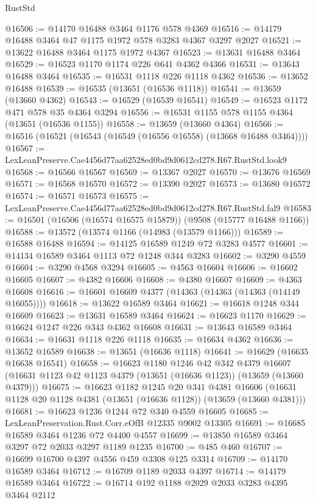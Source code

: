 \begin{lexlean}{RustStd}
\begin{coremodule}
@16506 := @14170 @16488 @3464 @1176 @578 @4369
@16516 := @14179 @16488 @3464 @47 @1175 @1972 @578 @3283 @4367 @3297 @2027
@16521 := @13622 @16488 @3464 @1175 @1972 @4367
@16523 := @13631 @16488 @3464
@16529 := @16523 @1170 @1174 @226 @641 @4362 @4366
@16531 := @13643 @16488 @3464
@16535 := @16531 @1118 @226 @1118 @4362
@16536 := @13652 @16488
@16539 := @16535 (@13651 (@16536 @1118))
@16541 := @13659 (@13660 @4362)
@16543 := @16529 (@16539 @16541)
@16549 := @16523 @1172 @471 @578 @35 @4364 @3294
@16556 := @16531 @1155 @578 @1155 @4364 (@13651 (@16536 @1155))
@16558 := @13659 (@13660 @4364)
@16566 := @16516 (@16521 (@16543 (@16549 (@16556 @16558) (@13668 @16488 @3464))))
@16567 := LexLeanPreserve.Cae4456d77aa62528ed0bd9d0612cd278.R67.RustStd.look9
@16568 := @16566 @16567
@16569 := @13367 @2027
@16570 := @13676 @16569
@16571 := @16568 @16570
@16572 := @13390 @2027
@16573 := @13680 @16572
@16574 := @16571 @16573
@16575 := LexLeanPreserve.Cae4456d77aa62528ed0bd9d0612cd278.R67.RustStd.fal9
@16583 := @16501 (@16506 (@16574 @16575 @15879)) (@9508 (@15777 @16488 @1166))
@16588 := @13572 (@13574 @1166 (@14983 (@13579 @1166)))
@16589 := @16588 @16488
@16594 := @14125 @16589 @1249 @72 @3283 @4577
@16601 := @14134 @16589 @3464 @1113 @72 @1248 @344 @3283
@16602 := @3290 @4559
@16604 := @3290 @4568 @3294
@16605 := @4563 @16604
@16606 := @16602 @16605
@16607 := @4382 @16606
@16608 := @4380 @16607
@16609 := @4363 @16608
@16616 := @16601 @16609 @4377 (@14363 (@14363 (@14363 (@14149 @16055))))
@16618 := @13622 @16589 @3464
@16621 := @16618 @1248 @344 @16609
@16623 := @13631 @16589 @3464
@16624 := @16623 @1170
@16629 := @16624 @1247 @226 @343 @4362 @16608
@16631 := @13643 @16589 @3464
@16634 := @16631 @1118 @226 @1118
@16635 := @16634 @4362
@16636 := @13652 @16589
@16638 := @13651 (@16636 @1118)
@16641 := @16629 (@16635 @16638 @16541)
@16658 := @16623
    @1180
    @1246
    @42
    @342
    @4379
    @16607
    (@16631 @1123 @42 @1123 @4379 (@13651 (@16636 @1123)) (@13659 (@13660 @4379)))
@16675 := @16623
    @1182
    @1245
    @20
    @341
    @4381
    @16606
    (@16631 @1128 @20 @1128 @4381 (@13651 (@16636 @1128)) (@13659 (@13660 @4381)))
@16681 := @16623 @1236 @1244 @72 @340 @4559 @16605
@16685 := LexLeanPreservation.Rust.Corr.eOfB @12335 @9002 @13305
@16691 := @16685 @16589 @3464 @1236 @72 @4400 @4557
@16699 := @13850 @16589 @3464 @3297 @72 @2033 @3297 @1189 @1235
@16700 := @485 @460
@16707 := @16699 @16700 @4397 @4556 @459 @3308 @125 @3314
@16709 := @14170 @16589 @3464
@16712 := @16709 @1189 @2033 @4397
@16714 := @14179 @16589 @3464
@16722 := @16714 @192 @1188 @2029 @2033 @3283 @4395 @3464 @2112

\end{coremodule}
\end{lexlean}
